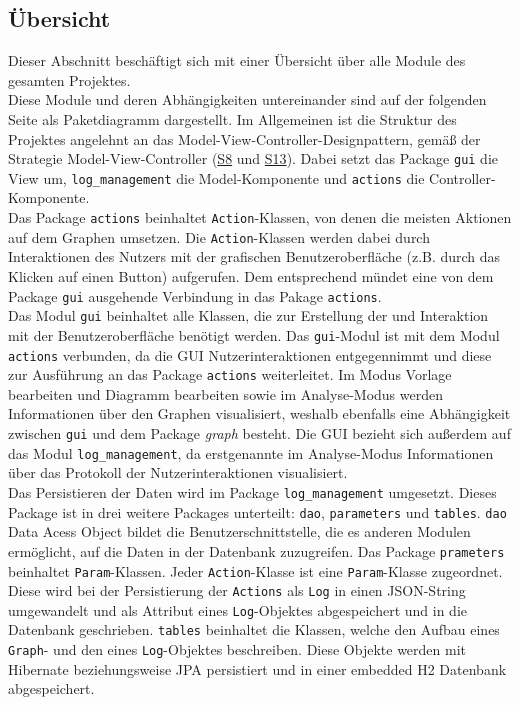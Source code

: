 \documentclass[enabledeprecatedfontcommands,fontsize=11pt,paper=a4,twoside]{scrartcl}
\newcounter{one}
\begin{document}
\newpage

\subsection{Übersicht}
Dieser Abschnitt beschäftigt sich mit einer Übersicht über alle Module des gesamten Projektes. \\
Diese Module und deren Abhängigkeiten untereinander sind auf der folgenden Seite als Paketdiagramm dargestellt.
Im Allgemeinen ist die Struktur des Projektes angelehnt an das Model-View-Controller-Designpattern, gemäß der Strategie Model-View-Controller (\glqq\hyperlink{bbb}{S8}\grqq{} und \glqq\hyperlink{modelviewcontroller}{S13}\grqq). Dabei setzt das Package \texttt{gui} die View um, \texttt{log\_management} die Model-Komponente und \texttt{actions} die Controller-Komponente. \\

Das Package \texttt{actions} beinhaltet \texttt{Action}-Klassen, von denen die meisten Aktionen auf dem Graphen umsetzen. Die \texttt{Action}-Klassen werden dabei durch Interaktionen des Nutzers mit der grafischen Benutzeroberfläche (z.B. durch das Klicken auf einen Button) aufgerufen. Dem entsprechend mündet eine von dem Package \texttt{gui} ausgehende Verbindung in das Pakage \texttt{actions}. \\

Das Modul \texttt{gui} beinhaltet alle Klassen, die zur Erstellung der und Interaktion mit der Benutzeroberfläche benötigt werden. Das \texttt{gui}-Modul ist mit dem Modul \texttt{actions} verbunden, da die GUI Nutzerinteraktionen entgegennimmt und diese zur Ausführung an das Package \texttt{actions} weiterleitet. Im Modus \glqq Vorlage bearbeiten\grqq{} und \glqq Diagramm bearbeiten\grqq{} sowie im \glqq Analyse\grqq-Modus werden Informationen über den Graphen visualisiert, weshalb ebenfalls eine Abhängigkeit zwischen \texttt{gui} und dem Package \textit{graph} besteht. Die GUI bezieht sich außerdem auf das Modul \texttt{log\_management}, da erstgenannte im \glqq Analyse\grqq{}-Modus Informationen über das Protokoll der Nutzerinteraktionen visualisiert. \\

Das Persistieren der Daten wird im Package \texttt{log\_management} umgesetzt. Dieses Package ist in drei weitere Packages unterteilt: \texttt{dao}, \texttt{parameters} und \texttt{tables}. \texttt{dao} \glqq Data Acess Object\grqq{} bildet die Benutzerschnittstelle, die es anderen Modulen ermöglicht, auf die Daten in der Datenbank zuzugreifen. Das Package \texttt{prameters} beinhaltet \texttt{Param}-Klassen. Jeder \texttt{Action}-Klasse ist eine \texttt{Param}-Klasse zugeordnet. Diese wird bei der Persistierung der \texttt{Actions} als \texttt{Log} in einen JSON-String umgewandelt und als Attribut eines \texttt{Log}-Objektes abgespeichert und in die Datenbank geschrieben. \texttt{tables} beinhaltet die Klassen, welche den Aufbau eines \texttt{Graph}- und den eines \texttt{Log}-Objektes beschreiben. Diese Objekte werden mit Hibernate beziehungsweise JPA persistiert und in einer embedded H2 Datenbank abgespeichert. \\ 
\end{document}

